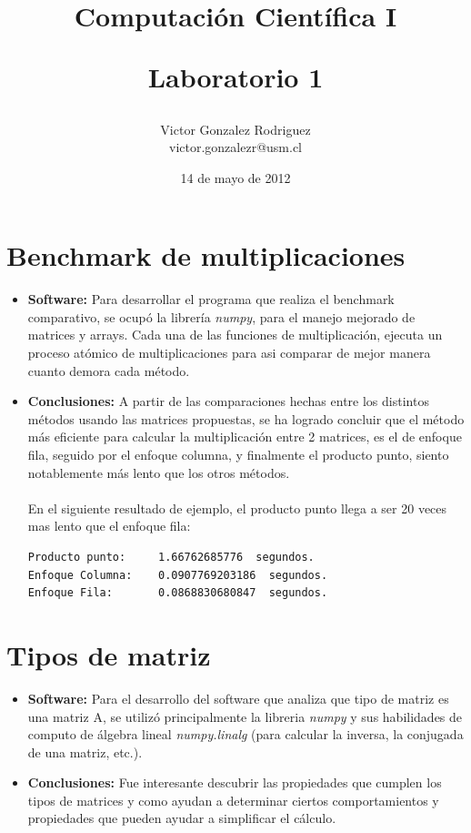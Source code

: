 \documentclass[12pt,letterpaper]{article}
\begin{document}
\title{Computaci\'on Científica I \\ \begin{Large}Laboratorio 1\end{Large}}
\author{Victor Gonzalez Rodriguez\\victor.gonzalezr@usm.cl}
\date{14 de mayo de 2012}
\maketitle


\section{Benchmark de multiplicaciones}
\begin{itemize}
\item \textbf{Software:} Para desarrollar el programa que realiza el benchmark comparativo, se ocupó la librería \textit{numpy}, para el manejo mejorado de matrices y arrays. Cada una de las funciones de multiplicación, ejecuta un proceso atómico de multiplicaciones para asi comparar de mejor manera cuanto demora cada método.
\item \textbf{Conclusiones:} A partir de las comparaciones hechas entre los distintos métodos usando las matrices propuestas, se ha logrado concluir que el método más eficiente para calcular la multiplicación entre 2 matrices, es el de enfoque fila, seguido por el enfoque columna, y finalmente el producto punto, siento notablemente más lento que los otros métodos.\\\\
En el siguiente resultado de ejemplo, el producto punto llega a ser 20 veces mas lento que el enfoque fila:
\begin{verbatim}
Producto punto:		1.66762685776  segundos.
Enfoque Columna:	0.0907769203186  segundos.
Enfoque Fila:		0.0868830680847  segundos.
\end{verbatim}
\end{itemize}

\section{Tipos de matriz}
\begin{itemize}
\item \textbf{Software:} Para el desarrollo del software que analiza que tipo de matriz es una matriz A, se utilizó principalmente la libreria \textit{numpy} y sus habilidades de computo de álgebra lineal \textit{numpy.linalg} (para calcular la inversa, la conjugada de una matriz, etc.).
\item \textbf{Conclusiones:} Fue interesante descubrir las propiedades que cumplen los tipos de matrices y como ayudan a determinar ciertos comportamientos y propiedades que pueden ayudar a simplificar el cálculo.
\end{itemize}
\end{document}
